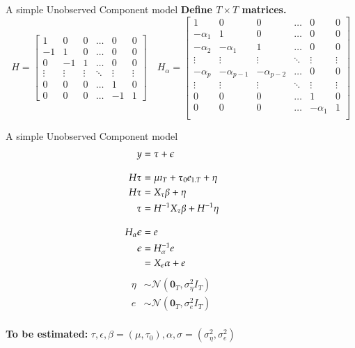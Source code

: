 \documentclass[notes,blackandwhite,mathsans,usenames,dvipsnames]{beamer}
\begin{document}
\begin{frame}{A simple Unobserved Component model}
\normalsize\smallskip\textbf{Define $T\times T$ matrices.}\scriptsize
$$
H=\begin{bmatrix}
1&0&0&\dots&0&0\\
-1&1&0&\dots&0&0\\
0&-1&1&\dots&0&0\\
\vdots&\vdots&\vdots&\ddots&\vdots&\vdots\\
0&0&0&\dots&1&0\\
0&0&0&\dots&-1&1
\end{bmatrix}\quad
H_\alpha=\begin{bmatrix}
1&0&0&\dots&0&0\\
-\alpha_1&1&0&\dots&0&0\\
-\alpha_2&-\alpha_1&1&\dots&0&0\\
\vdots&\vdots&\vdots&\ddots&\vdots&\vdots\\
-\alpha_p&-\alpha_{p-1}&-\alpha_{p-2}&\dots&0&0\\
\vdots&\vdots&\vdots&\ddots&\vdots&\vdots\\
0&0&0&\dots&1&0\\
0&0&0&\dots&-\alpha_1&1\\
\end{bmatrix}
$$

\end{frame}



\begin{frame}{A simple Unobserved Component model}
\setcounter{equation}{0}
\begin{align}
y &= \tau + \epsilon\\[2ex]
H\tau &= \mu \imath_T + \tau_0 e_{1.T} + \eta \qquad \\ \setcounter{equation}{1}
H\tau &=  X_\tau \beta + \eta\\ \setcounter{equation}{1}
\tau&= H^{-1} X_\tau \beta + H^{-1}\eta\\[2ex] 
H_\alpha \epsilon &=  e\\ \setcounter{equation}{2}
\epsilon &=  H_\alpha^{-1}e \\ \setcounter{equation}{2}
&= X_\epsilon \alpha + e 
\end{align}
\begin{align*}
\eta &\sim \mathcal{N}\left(\mathbf{0}_T, \sigma^2_\eta I_T\right)\qquad\\
e &\sim \mathcal{N}\left(\mathbf{0}_T, \sigma^2_e I_T\right)\\
\end{align*}

\textbf{To be estimated:} $\tau, \epsilon, \beta=(\mu,\tau_0), \alpha, \sigma=(\sigma^2_\eta, \sigma^2_e)$
\end{frame}
\end{document}
